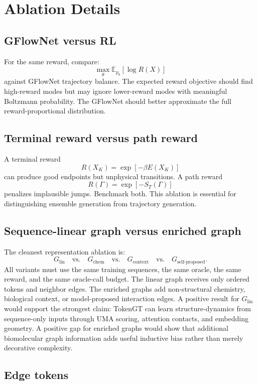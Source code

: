 \documentclass[11pt]{article}
\newcommand{\E}{\mathbb{E}}
\begin{document}
\section{Ablation Details}

\subsection{GFlowNet versus RL}

For the same reward, compare:
\[
\max_\theta \E_{p_\theta}[\log R(X)]
\]
against GFlowNet trajectory balance. The expected reward objective should find high-reward modes but may ignore lower-reward modes with meaningful Boltzmann probability. The GFlowNet should better approximate the full reward-proportional distribution.

\subsection{Terminal reward versus path reward}

A terminal reward
\[
R(X_K)=\exp[-\beta E(X_K)]
\]
can produce good endpoints but unphysical transitions. A path reward
\[
R(\Gamma)=\exp[-S_T(\Gamma)]
\]
penalizes implausible jumps. Benchmark both. This ablation is essential for distinguishing ensemble generation from trajectory generation.

\subsection{Sequence-linear graph versus enriched graph}

The cleanest representation ablation is:
\[
G_{\mathrm{lin}}
\quad\text{vs.}\quad
G_{\mathrm{chem}}
\quad\text{vs.}\quad
G_{\mathrm{context}}
\quad\text{vs.}\quad
G_{\mathrm{self}\text{-}\mathrm{proposed}}.
\]
All variants must use the same training sequences, the same oracle, the same reward, and the same oracle-call budget. The linear graph receives only ordered tokens and neighbor edges. The enriched graphs add non-structural chemistry, biological context, or model-proposed interaction edges. A positive result for $G_{\mathrm{lin}}$ would support the strongest claim: TokenGT can learn structure-dynamics from sequence-only inputs through UMA scoring, attention contacts, and embedding geometry. A positive gap for enriched graphs would show that additional biomolecular graph information adds useful inductive bias rather than merely decorative complexity.

\subsection{Edge tokens}
\end{document}
